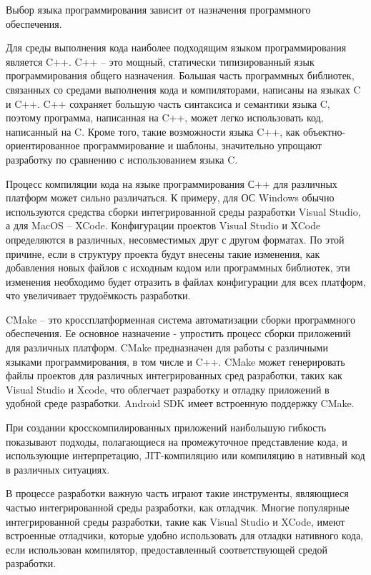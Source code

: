 Выбор языка программирования зависит от назначения программного обеспечения.

Для среды выполнения кода наиболее подходящим языком программирования является C++.
C++ -- это мощный, статически типизированный язык программирования общего назначения.
Большая часть программных библиотек, связанных со средами выполнения кода и компиляторами, написаны на языках C и C++.
C++ сохраняет большую часть синтаксиса и семантики языка C, поэтому программа, написанная на C++, может легко использовать код, написанный на C.
Кроме того, такие возможности языка C++, как объектно-ориентированное программирование и шаблоны, значительно упрощают разработку по сравнению с использованием языка C.

Процесс компиляции кода на языке программирования С++ для различных платформ может сильно различаться.
К примеру, для ОС Windows обычно используются средства сборки интегрированной среды разработки Visual Studio, а для MacOS -- XCode.
Конфигурации проектов Visual Studio и XCode определяются в различных, несовместимых друг с другом форматах.
По этой причине, если в структуру проекта будут внесены такие изменения, как добавления новых файлов с исходным кодом или программных библиотек, эти изменения необходимо будет отразить в файлах конфигурации для всех платформ, что увеличивает трудоёмкость разработки.

CMake -- это кроссплатформенная система автоматизации сборки программного обеспечения. Ее основное назначение - упростить процесс сборки приложений для различных платформ. 
CMake предназначен для работы с различными языками программирования, в том числе и C++.
CMake может генерировать файлы проектов для различных интегрированных сред разработки, таких как Visual Studio и Xcode, что облегчает разработку и отладку приложений в удобной среде разработки.
Android SDK имеет встроенную поддержку CMake.

При создании кросскомпилированных приложений наибольшую гибкость показывают подходы, полагающиеся на промежуточное представление кода, и использующие интерпретацию, JIT-компиляцию или компиляцию в нативный код в различных ситуациях.

В процессе разработки важную часть играют такие инструменты, являющиеся частью интегрированной среды разработки, как отладчик.
Многие популярные интегрированной среды разработки, такие как Visual Studio и XCode, имеют встроенные отладчики, которые удобно использовать для отладки нативного кода, если использован компилятор, предоставленный соответствующей средой разработки.

